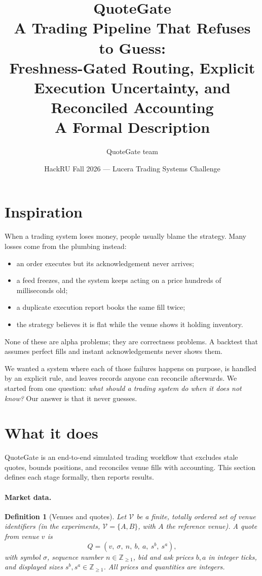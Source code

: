 \documentclass[11pt]{article}
\title{\textbf{QuoteGate}\\[2pt]
\large A Trading Pipeline That Refuses to Guess:\\
Freshness-Gated Routing, Explicit Execution Uncertainty, and Reconciled Accounting\\[4pt]
\normalsize A Formal Description}
\author{QuoteGate team}
\date{HackRU Fall 2026 --- Lucera Trading Systems Challenge}
\newtheorem{definition}{Definition}
\theoremstyle{remark}
\newcommand{\Z}{\mathbb{Z}}
\newcommand{\Venues}{\mathcal{V}}
\begin{document}
\maketitle

\section*{Inspiration}

When a trading system loses money, people usually blame the strategy. Many losses come from
the plumbing instead:
\begin{itemize}[leftmargin=1.5em, itemsep=0pt]
  \item an order executes but its acknowledgement never arrives;
  \item a feed freezes, and the system keeps acting on a price hundreds of milliseconds old;
  \item a duplicate execution report books the same fill twice;
  \item the strategy believes it is flat while the venue shows it holding inventory.
\end{itemize}
None of these are alpha problems; they are correctness problems. A backtest that assumes perfect
fills and instant acknowledgements never shows them.

We wanted a system where each of those failures happens on purpose, is handled by an explicit
rule, and leaves records anyone can reconcile afterwards. We started from one question:
\emph{what should a trading system do when it does not know?} Our answer is that it never
guesses.

\section*{What it does}

QuoteGate is an end-to-end simulated trading workflow that excludes stale quotes, bounds
positions, and reconciles venue fills with accounting. This section defines each stage
formally, then reports results.

\paragraph{Market data.}

\begin{definition}[Venues and quotes]
Let $\Venues$ be a finite, totally ordered set of venue identifiers (in the experiments,
$\Venues = \{A, B\}$, with $A$ the reference venue). A quote from venue $v$ is
\[
  Q = (v,\ \sigma,\ n,\ b,\ a,\ s^b,\ s^a),
\]
with symbol $\sigma$, sequence number $n \in \Z_{\ge 1}$, bid and ask prices $b, a$ in integer
ticks, and displayed sizes $s^b, s^a \in \Z_{\ge 1}$. All prices and quantities are integers.
\end{definition}
\end{document}
